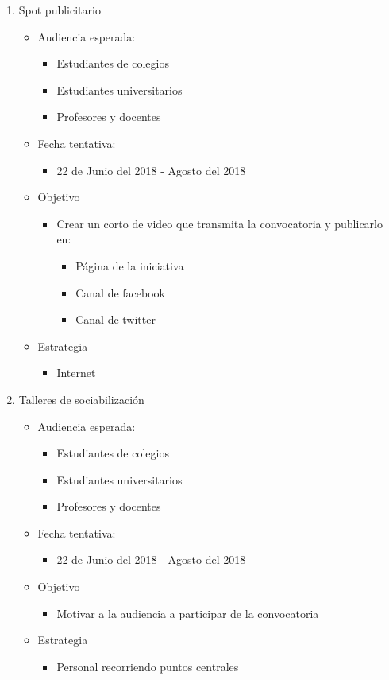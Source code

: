 \documentclass{article}
\begin{document}
\begin{enumerate}
\item Spot publicitario 
\begin{itemize}
\item Audiencia esperada:
\begin{itemize}
\item Estudiantes de colegios
\item Estudiantes universitarios
\item Profesores y docentes
\end{itemize}
\item Fecha tentativa:
\begin{itemize}
\item 22 de Junio del 2018 - Agosto del 2018
\end{itemize}
\item Objetivo
\begin{itemize}
\item Crear un corto de video que transmita la convocatoria y publicarlo en:
\begin{itemize}
\item Página de la iniciativa 
\item Canal de facebook
\item Canal de twitter
\end{itemize}
\end{itemize}
\item Estrategia
\begin{itemize}
\item Internet
\end{itemize}
\end{itemize}

\item Talleres de sociabilización 
\begin{itemize}
\item Audiencia esperada:
\begin{itemize}
\item Estudiantes de colegios
\item Estudiantes universitarios
\item Profesores y docentes
\end{itemize}
\item Fecha tentativa:
\begin{itemize}
\item 22 de Junio del 2018 - Agosto del 2018
\end{itemize}
\item Objetivo
\begin{itemize}
\item Motivar a la audiencia a participar de la convocatoria
\end{itemize}
\item Estrategia
\begin{itemize}
\item Personal recorriendo puntos centrales
\end{itemize}
\end{itemize}



\end{enumerate}
\end{document}
